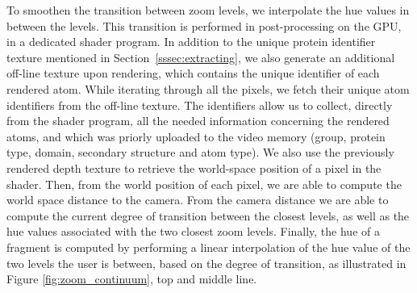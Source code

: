\documentclass{egpubl}
\begin{document}
	
	To smoothen the transition between zoom levels, we interpolate the hue values in between the levels.	
	This transition is performed in post-processing on the GPU, in a dedicated shader program.
	In addition to the unique protein identifier texture mentioned in Section~\ref{sssec:extracting}, we also generate an additional off-line texture upon rendering, which contains the unique identifier of each rendered atom.
	While iterating through all the pixels, we fetch their unique atom identifiers from the off-line texture.
	The identifiers allow us to collect, directly from the shader program, all the needed information concerning the rendered atoms, and which was priorly uploaded to the video memory (group, protein type, domain, secondary structure and atom type).	
	We also use the previously rendered depth texture to retrieve the world-space position of a pixel in the shader.
	Then, from the world position of each pixel, we are able to compute the world space distance to the camera.
	From the camera distance we are able to compute the current degree of transition between the closest levels, as well as the hue values associated with the two closest zoom levels.	
	Finally, the hue of a fragment is computed by performing a linear interpolation of the hue value of the two levels the user is between, based on the degree of transition, as illustrated in Figure \ref{fig:zoom_continuum}, top and middle line. 
	
\end{document}
